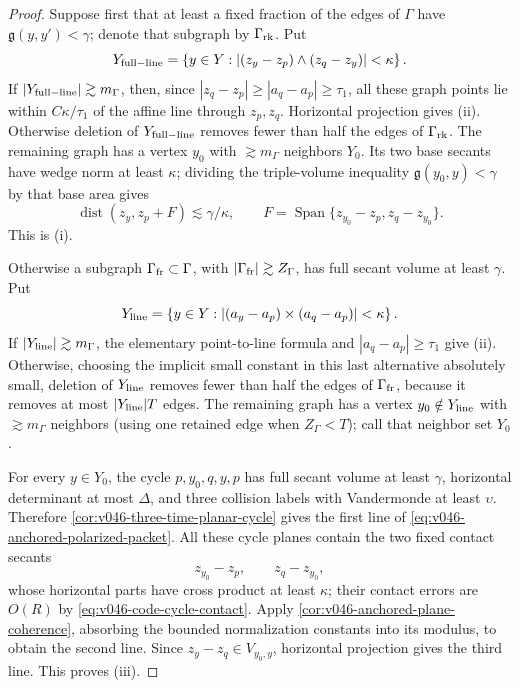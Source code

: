 \documentclass[10pt]{article}
\newcommand{\Span}{\operatorname{Span}}
\begin{document}
\begin{proof}
Suppose first that at least a fixed fraction of the edges of \(\Gamma\) have
\(\mathfrak g(y,y')<\gamma\); denote that subgraph by \(\Gamma_{\rm rk}\).  Put
\[
Y_{\rm full-line}
=
\left\{
y\in Y:
|(z_y-z_p)\wedge(z_q-z_y)|<\kappa
\right\}.
\]
If \(|Y_{\rm full-line}|\gtrsim m_\Gamma\), then, since
\(|z_q-z_p|\ge|a_q-a_p|\ge\tau_1\), all these graph points lie within
\(C\kappa/\tau_1\) of the affine line through \(z_p,z_q\).  Horizontal projection gives (ii).
Otherwise deletion of \(Y_{\rm full-line}\) removes fewer than half the edges of
\(\Gamma_{\rm rk}\).  The remaining graph has a vertex \(y_0\) with \(\gtrsim m_\Gamma\)
neighbors \(Y_0\).  Its two base secants have wedge norm at least \(\kappa\); dividing the
triple-volume inequality \(\mathfrak g(y_0,y)<\gamma\) by that base area gives
\[
\operatorname{dist}(z_y,z_p+F)
\lesssim
\gamma/\kappa,
\qquad
F=\Span\{z_{y_0}-z_p,z_q-z_{y_0}\}.
\]
This is (i).

Otherwise a subgraph \(\Gamma_{\rm fr}\subset\Gamma\), with
\(|\Gamma_{\rm fr}|\gtrsim Z_\Gamma\), has full secant volume at least \(\gamma\).  Put
\[
Y_{\rm line}
=
\left\{
y\in Y:
|(a_y-a_p)\times(a_q-a_p)|<\kappa
\right\}.
\]
If \(|Y_{\rm line}|\gtrsim m_\Gamma\), the elementary point-to-line formula and
\(|a_q-a_p|\ge\tau_1\) give (ii).  Otherwise, choosing the implicit small constant in this last
alternative absolutely small, deletion of \(Y_{\rm line}\) removes fewer than half the edges of
\(\Gamma_{\rm fr}\), because it removes at most \(|Y_{\rm line}|T\) edges.  The remaining graph has
a vertex \(y_0\notin Y_{\rm line}\) with \(\gtrsim m_\Gamma\) neighbors (using one retained edge
when \(Z_\Gamma<T\)); call that neighbor set \(Y_0\).

For every \(y\in Y_0\), the cycle \(p,y_0,q,y,p\) has full secant volume at least \(\gamma\),
horizontal determinant at most \(\Delta\), and three collision labels with Vandermonde at least
\(\upsilon\).  Therefore \cref{cor:v046-three-time-planar-cycle} gives the first line of
\eqref{eq:v046-anchored-polarized-packet}.  All these cycle planes contain the two fixed contact
secants
\[
z_{y_0}-z_p,
\qquad
z_q-z_{y_0},
\]
whose horizontal parts have cross product at least \(\kappa\); their contact errors are \(O(R)\)
by \eqref{eq:v046-code-cycle-contact}.  Apply
\cref{cor:v046-anchored-plane-coherence}, absorbing the bounded normalization constants into its
modulus, to obtain the second line.  Since \(z_y-z_q\in V_{y_0,y}\), horizontal projection gives
the third line.  This proves (iii).


\end{proof}
\end{document}

